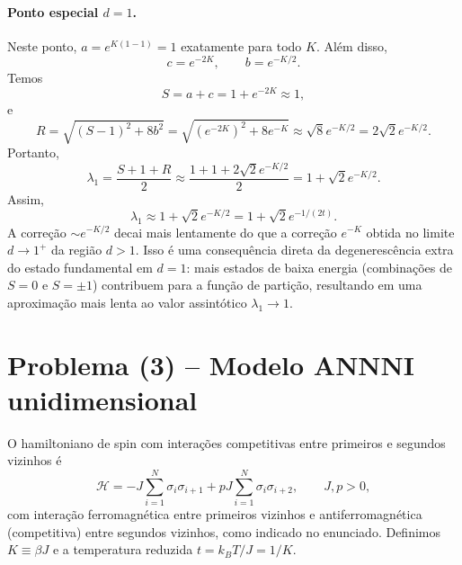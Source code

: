 \documentclass[11pt,a4paper]{article}
\begin{document}
\paragraph{Ponto especial $d = 1$.}
%
Neste ponto, $a = e^{K(1-1)} = 1$ exatamente para todo $K$. Além disso,
\begin{equation}
    c = e^{-2K}, \qquad b = e^{-K/2}.
\end{equation}
%
Temos
%
\begin{equation}
    S = a + c = 1 + e^{-2K} \approx 1,
\end{equation}
%
e
%
\begin{equation}
    R = \sqrt{(S - 1)^2 + 8b^2}
    = \sqrt{(e^{-2K})^2 + 8 e^{-K}}
    \approx \sqrt{8} e^{-K/2} = 2\sqrt{2} e^{-K/2}.
\end{equation}
%
Portanto,
%
\begin{equation}
    \lambda_1 = \frac{S + 1 + R}{2}
    \approx \frac{1 + 1 + 2\sqrt{2} e^{-K/2}}{2}
    = 1 + \sqrt{2} e^{-K/2}.
\end{equation}
%
Assim,
%
\begin{equation}
    \boxed{
    \lambda_1 \approx 1 + \sqrt{2} e^{-K/2} = 1 + \sqrt{2} e^{-1/(2t)}.
    }
\end{equation}
%
A correção $\sim e^{-K/2}$ decai mais lentamente do que a correção $e^{-K}$ obtida no limite $d \to 1^+$ da região $d > 1$. Isso é uma consequência direta da degenerescência extra do estado fundamental em $d = 1$: mais estados de baixa energia (combinações de $S = 0$ e $S = \pm 1$) contribuem para a função de partição, resultando em uma aproximação mais lenta ao valor assintótico $\lambda_1 \to 1$.
\section*{Problema (3) -- Modelo ANNNI unidimensional}
%
O hamiltoniano de spin com interações competitivas entre primeiros e segundos vizinhos é
%
\begin{equation}
    \mathcal H=-J\sum_{i=1}^N\sigma_i\sigma_{i+1}+pJ\sum_{i=1}^N\sigma_i\sigma_{i+2},
    \qquad J,p>0,
    \label{eq:H_annni}
\end{equation}
%
com interação ferromagnética entre primeiros vizinhos e antiferromagnética (competitiva) entre segundos vizinhos, como indicado no enunciado. Definimos $K\equiv\beta J$ e a temperatura reduzida $t=k_BT/J=1/K$.
%
\end{document}

